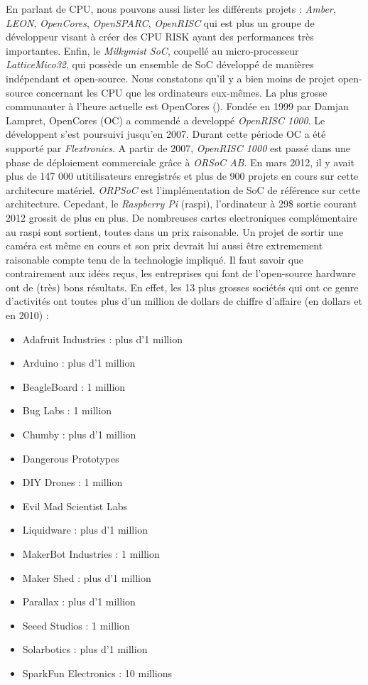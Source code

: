 \medskip
En parlant de CPU, nous pouvons aussi lister les différents projets : \textit{Amber}, \textit{LEON}, \textit{OpenCores}, \textit{OpenSPARC}, \textit{OpenRISC} qui est plus un groupe de développeur visant à créer des CPU RISK ayant des performances très importantes. Enfin, le \textit{Milkymist SoC}, coupellé au micro-processeur \textit{LatticeMico32}, qui possède un ensemble de SoC développé de manières indépendant et open-source. Nous constatons qu'il y a bien moins de projet open-source concernant les CPU que les ordinateurs eux-mêmes.
\medskip
La plus grosse communauter à l'heure actuelle est OpenCores (). Fondée en 1999 par Damjan Lampret, OpenCores (OC) a commendé a developpé \textit{OpenRISC 1000}. Le développent s'est poursuivi jusqu'en 2007. Durant cette période OC a été supporté par \textit{Flextronics}. A partir de 2007, \textit{OpenRISC 1000} est passé dans une phase de déploiement commerciale grâce à \textit{ORSoC AB}. En mars 2012, il y avait plus de 147 000 utitilisateurs enregistrés et plus de 900 projets en cours sur cette architecure matériel. \textit{ORPSoC} est l'implémentation de SoC de référence sur cette architecture. Cepedant, le \textit{Raspberry Pi} (raspi), l'ordinateur à 29\$ sortie courant 2012 grossit de plus en plus. De nombreuses cartes electroniques complémentaire au raspi sont sortient, toutes dans un prix raisonable. Un projet de sortir une caméra est même en cours et son prix devrait lui aussi être extremement raisonable compte tenu de la technologie impliqué. 
\medskip
Il faut savoir que contrairement aux idées reçus, les entreprises qui font de l'open-source hardware ont de (très) bons résultats. En effet, les 13 plus grosses sociétés qui ont ce genre d'activités ont toutes plus d'un million de dollars de chiffre d'affaire (en dollars et en 2010) :
\begin{itemize}
\item Adafruit Industries : plus d'1 million
\item Arduino : plus d'1 million
\item BeagleBoard : 1 million
\item Bug Labs : 1 million
\item Chumby : plus d'1 million
\item Dangerous Prototypes
\item DIY Drones : 1 million
\item Evil Mad Scientist  Labs
\item Liquidware : plus d'1 million
\item MakerBot Industries : 1 million
\item Maker Shed : plus d'1 million
\item Parallax : plus d'1 million
\item Seeed Studios : 1 million
\item Solarbotics : plus d'1 million
\item SparkFun Electronics : 10 millions
\end{itemize} 
